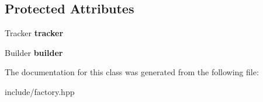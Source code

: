 \subsection*{Protected Attributes}
\begin{DoxyCompactItemize}
\item 
\hypertarget{classcore_1_1_tracked_factory_adcde76686d0410a9df1f9a0d0ce49f29}{Tracker {\bfseries tracker}}\label{classcore_1_1_tracked_factory_adcde76686d0410a9df1f9a0d0ce49f29}

\item 
\hypertarget{classcore_1_1_tracked_factory_af98852312bb1543084e9d733d00e9fc8}{Builder {\bfseries builder}}\label{classcore_1_1_tracked_factory_af98852312bb1543084e9d733d00e9fc8}

\end{DoxyCompactItemize}


The documentation for this class was generated from the following file\-:\begin{DoxyCompactItemize}
\item 
include/factory.\-hpp\end{DoxyCompactItemize}
